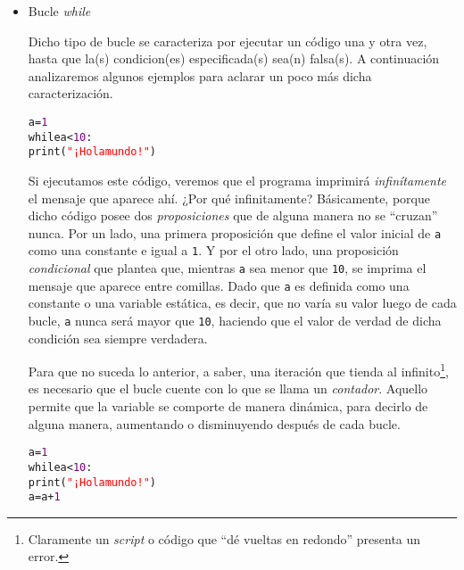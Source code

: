 \documentclass{article}
\begin{document}
\begin{enumerate}
  \begin{itemize}
  \item Bucle \emph{while}

    \par \hspace{5pt} Dicho tipo de bucle se caracteriza por ejecutar un código una y otra vez, hasta que la(s) condicion(es) especificada(s) sea(n) falsa(s). A continuación analizaremos algunos ejemplos para aclarar un poco más dicha caracterización.

    \begin{tcolorbox}
      \begin{alltt}
        a = \textcolor{purple}{1}
        while a < \textcolor{purple}{10}:
            print(\textcolor{red}{"¡Hola mundo!"})
      \end{alltt}        
    \end{tcolorbox}

    \par \hspace{5pt} Si ejecutamos este código, veremos que el programa imprimirá \emph{infinítamente} el mensaje que aparece ahí. ¿Por qué infinitamente? Básicamente, porque dicho código posee dos \emph{proposiciones} que de alguna manera no se ``cruzan'' nunca. Por un lado, una primera proposición que define el valor inicial de \verb|a| como una constante e igual a \verb|1|. Y por el otro lado, una proposición \emph{condicional} que plantea que, mientras \verb|a| sea menor que \verb|10|, se imprima el mensaje que aparece entre comillas.  Dado que \verb|a| es definida como una constante o una variable estática, es decir, que no varía su valor luego de cada bucle, \verb|a| nunca será mayor que \verb|10|, haciendo que el valor de verdad de dicha condición sea siempre verdadera.

    \par \hspace{5pt} Para que no suceda lo anterior, a saber, una iteración que tienda al infinito\footnote{Claramente un \emph{script} o código que ``dé vueltas en redondo'' presenta un error.}, es necesario que el bucle cuente con lo que se llama un \emph{contador}. Aquello permite que la variable se comporte de manera dinámica, para decirlo de alguna manera, aumentando o disminuyendo después de cada bucle.

\begin{tcolorbox}
\begin{alltt}
a = \textcolor{purple}{1}
while a < \textcolor{purple}{10}:
    print(\textcolor{red}{"¡Hola mundo!"})
    a = a + \textcolor{purple}{1}
\end{alltt}        
\end{tcolorbox}


\end{itemize}
\end{enumerate}
\end{document}
